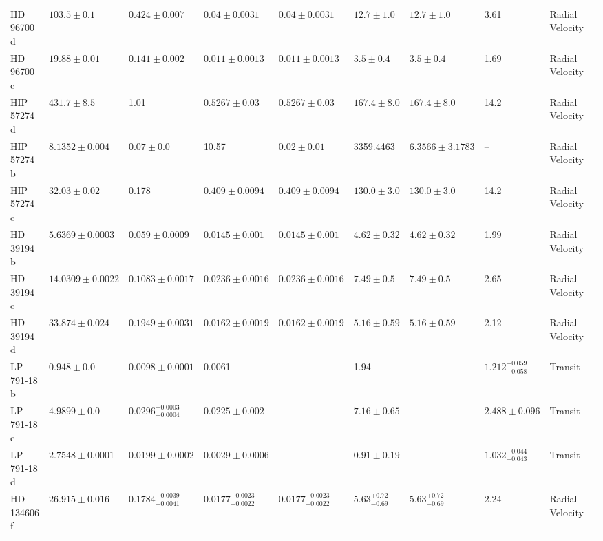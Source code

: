 \begin{tabular}{llllllllll}
HD 96700 d & $103.5 \pm 0.1$ & $0.424 \pm 0.007$ & $0.04 \pm 0.0031$ & $0.04 \pm 0.0031$ & $12.7 \pm 1.0$ & $12.7 \pm 1.0$ & 3.61 & Radial Velocity & \cite{UNGER_ET_AL__2021} \\
HD 96700 c & $19.88 \pm 0.01$ & $0.141 \pm 0.002$ & $0.011 \pm 0.0013$ & $0.011 \pm 0.0013$ & $3.5 \pm 0.4$ & $3.5 \pm 0.4$ & 1.69 & Radial Velocity & \cite{UNGER_ET_AL__2021} \\
HIP 57274 d & $431.7 \pm 8.5$ & 1.01 & $0.5267 \pm 0.03$ & $0.5267 \pm 0.03$ & $167.4 \pm 8.0$ & $167.4 \pm 8.0$ & 14.2 & Radial Velocity & \cite{FISCHER_ET_AL__2012} \\
HIP 57274 b & $8.1352 \pm 0.004$ & $0.07 \pm 0.0$ & 10.57 & $0.02 \pm 0.01$ & 3359.4463 & $6.3566 \pm 3.1783$ & -- & Radial Velocity & \cite{STASSUN_ET_AL__2017} \\
HIP 57274 c & $32.03 \pm 0.02$ & 0.178 & $0.409 \pm 0.0094$ & $0.409 \pm 0.0094$ & $130.0 \pm 3.0$ & $130.0 \pm 3.0$ & 14.2 & Radial Velocity & \cite{FISCHER_ET_AL__2012} \\
HD 39194 b & $5.6369 \pm 0.0003$ & $0.059 \pm 0.0009$ & $0.0145 \pm 0.001$ & $0.0145 \pm 0.001$ & $4.62 \pm 0.32$ & $4.62 \pm 0.32$ & 1.99 & Radial Velocity & \cite{STANDING_ET_AL_2026} \\
HD 39194 c & $14.0309 \pm 0.0022$ & $0.1083 \pm 0.0017$ & $0.0236 \pm 0.0016$ & $0.0236 \pm 0.0016$ & $7.49 \pm 0.5$ & $7.49 \pm 0.5$ & 2.65 & Radial Velocity & \cite{STANDING_ET_AL_2026} \\
HD 39194 d & $33.874 \pm 0.024$ & $0.1949 \pm 0.0031$ & $0.0162 \pm 0.0019$ & $0.0162 \pm 0.0019$ & $5.16 \pm 0.59$ & $5.16 \pm 0.59$ & 2.12 & Radial Velocity & \cite{STANDING_ET_AL_2026} \\
LP 791-18 b & $0.948 \pm 0.0$ & $0.0098 \pm 0.0001$ & 0.0061 & -- & 1.94 & -- & $1.212^{+0.059}_{-0.058}$ & Transit & \cite{PETERSON_ET_AL_2023} \\
LP 791-18 c & $4.9899 \pm 0.0$ & $0.0296^{+0.0003}_{-0.0004}$ & $0.0225 \pm 0.002$ & -- & $7.16 \pm 0.65$ & -- & $2.488 \pm 0.096$ & Transit & \cite{GREKLEK_MCKEON_ET_AL_2025} \\
LP 791-18 d & $2.7548 \pm 0.0001$ & $0.0199 \pm 0.0002$ & $0.0029 \pm 0.0006$ & -- & $0.91 \pm 0.19$ & -- & $1.032^{+0.044}_{-0.043}$ & Transit & \cite{GREKLEK_MCKEON_ET_AL_2025} \\
HD 134606 f & $26.915 \pm 0.016$ & $0.1784^{+0.0039}_{-0.0041}$ & $0.0177^{+0.0023}_{-0.0022}$ & $0.0177^{+0.0023}_{-0.0022}$ & $5.63^{+0.72}_{-0.69}$ & $5.63^{+0.72}_{-0.69}$ & 2.24 & Radial Velocity & \cite{LI_ET_AL_2024} \\

\end{tabular}
